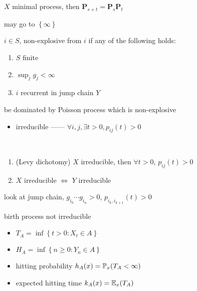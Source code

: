 \begin{prop}
    $X$ minimal process, then $\textbf{P}_{s+t} = \textbf{P}_s \textbf{P}_t$
\end{prop}
\begin{pf}
    may go to $\left\{ \infty \right\}$
\end{pf}

\begin{thm}
    $i \in S$, non-explosive from $i$ if any of the following holds:
    \begin{enumerate}
        \item $S$ finite
        \item $\sup_j g_j < \infty$
        \item $i$ recurrent in jump chain $Y$
    \end{enumerate}
\end{thm}
\begin{pf}
    be dominated by Poisson process which is non-explosive
\end{pf}

\begin{itemize}
    \item irreducible ------ $\forall i,j, \exists t > 0, p_{ij}(t) > 0$
\end{itemize}

\begin{thm}\,
    \begin{enumerate}
        \item (Levy dichotomy) $X$ irreducible, then $\forall t > 0$, $p_{ij}(t) > 0$
        \item $X$ irreducible $\iff$ $Y$ irreducible
    \end{enumerate}
\end{thm}
\begin{pf}
    look at jump chain, $g_{i_0}\cdots g_{i_n} > 0$, $p_{i_k, i_{k+1}}(t) > 0$
\end{pf}

\begin{fact}
    birth process not irreducible
\end{fact}

\begin{itemize}
    \item $T_A = \inf \left\{ t > 0 : X_t \in A \right\}$
    \item $H_A = \inf \left\{ n \geq 0 : Y_n \in A \right\}$
    \item hitting probability $h_A(x) = \mathbb{P}_x(T_A < \infty)$
    \item expected hitting time $k_A(x) = \mathbb{E}_x(T_A)$
\end{itemize}

